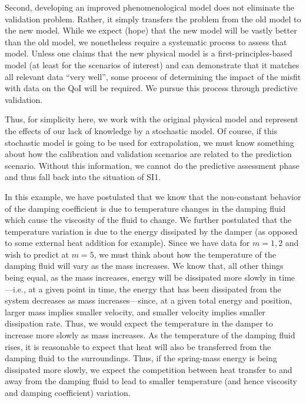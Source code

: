 \documentclass[11pt]{article}
\begin{document}
Second, developing an improved phenomenological model does not
eliminate the validation problem.  Rather, it simply transfers the
problem from the old model to the new model.  While we expect (hope)
that the new model will be vastly better than the old model, we
nonetheless require a systematic process to assess that model.  Unless
one claims that the new physical model is a first-principles-based
model (at least for the scenarios of interest) and can demonstrate
that it matches all relevant data ``very well'', some process of
determining the impact of the misfit with data on the QoI will be
required.  We pursue this process through predictive validation.

Thus, for simplicity here, we work with the original physical model
and represent the effects of our lack of knowledge by a stochastic
model.  Of course, if this stochastic model is going to be used for
extrapolation, we must know something about how the calibration and
validation scenarios are related to the prediction scenario.  Without
this information, we cannot do the predictive assessment phase and
thus fall back into the situation of SI1.

In this example, we have postulated that we know that the non-constant
behavior of the damping coefficient is due to temperature changes in
the damping fluid which cause the viscosity of the fluid to change.
We further postulated that the temperature variation is due to the
energy dissipated by the damper (as opposed to some external heat
addition for example).  Since we have data for $m=1,2$ and wish to
predict at $m=5$, we must think about how the temperature of the
damping fluid will vary as the mass increases.  We know that, all
other things being equal, as the mass increases, energy will be
dissipated more slowly in time---i.e., at a given point in time, the
energy that has been dissipated from the system decreases as mass
increases---since, at a given total energy and position, larger mass
implies smaller velocity, and smaller velocity implies smaller
dissipation rate.  Thus, we would expect the temperature in the damper
to increase more slowly as mass increases.  As the temperature of the
damping fluid rises, it is reasonable to expect that heat will also be
transferred from the damping fluid to the surroundings.  Thus, if the
spring-mass energy is being dissipated more slowly, we expect the
competition between heat transfer to and away from the damping fluid
to lead to smaller temperature (and hence viscosity and damping
coefficient) variation.
\end{document}
